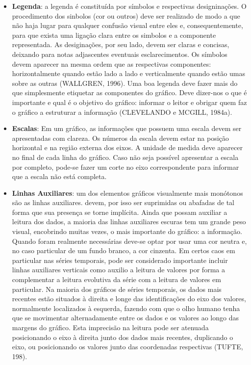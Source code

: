 \begin{itemize}
\newpage
\item \textbf{Legenda}: a legenda é constituída por símbolos e respectivas designinações. O procedimento dos sinbolos (cor ou outros) deve ser realizado de modo a que não haja lugar para qualquer confusão visual entre eles e, consequentemente, para que exista uma ligação clara entre os simbolos e a componente representada. As desiginações, por seu lado, devem ser claras e concisas, deixando para notas adjascentes eventuais esclarecimentos. Os símbolos devem aparecer na mesma ordem que as respectivas componentes: horizontalmente quando estão lado a lado e verticalmente quando estão umas sobre as outras (WALLGREN, 1996). Uma boa legenda deve fazer mais do que simplesmente etiquetar as componentes do gráfico. Deve dizer-nos o que é importante e qual é o objetivo do gráfico:   
informar o leitor e obrigar quem faz o gráfico a estruturar a informação (CLEVELANDO e MCGILL, 1984a).
\item \textbf{Escalas}: Em um gráfico, as informações que possuem uma escala devem ser apresentadas com clareza. Os números da escala devem estar na posição horizontal e na região externa dos eixos. A unidade de medida deve aparecer no final de cada linha do gráfico. Caso não seja possível apresentar a escala por completo, pode-se fazer um corte no eixo correspondente para informar que a escala não está completa.


\item \textbf{Linhas Auxiliares}: um dos elementos gráficos visualmente mais mo\-nó\-to\-nos são as linhas auxiliares. devem, por isso ser suprimidas ou abafadas de tal forma que sua presença se torne implícita. Ainda que possam auxiliar a leitura dos dados, a maioria das linhas auxiliares escuras tem um grande peso visual, encobrindo muitas vezes, o mais importante do gráfico: a informação. Quando foram realmente necessárias deve-se optar por usar uma cor neutra e, no caso particular de um fundo branco, a cor cinzenta. Em certos caos em particular nas séries temporais, pode ser considerado importante incluir linhas auxiliares verticais como auxilio a leitura de valores por forma a complementar a leitura evolutiva da série com a leitura de valores em particular. Na maioria dos gráficos de séries temporais, os dados mais recentes estão situados à direita e longe das identificações do eixo dos valores, normalmente localizados à esquerda, fazendo com que o olho humano tenha que se movimentar alternadamente entre os dados e os valores ao longo das margens do gráfico. 
\newpage
Esta imprecisão na leitura pode ser atenuada posicionando o eixo à direita junto dos dados mais recentes, duplicando o eixo, ou posicionando os valores junto das coordenadas respectivas (TUFTE, 198).\vskip0.3cm


\end{itemize}
